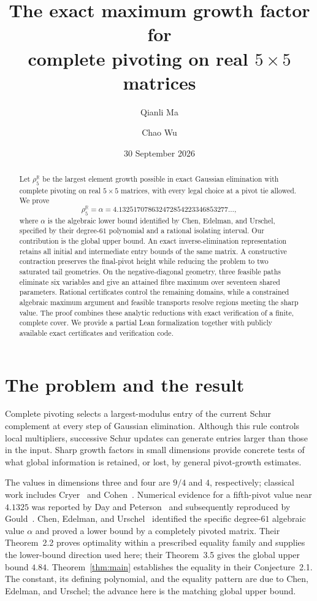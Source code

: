 \documentclass[11pt,reqno]{amsart}
\title[The exact growth factor for complete pivoting]
{The exact maximum growth factor for\\
complete pivoting on real \(5\times5\) matrices}
\author{Qianli Ma}
\author{Chao Wu}
\date{30 September 2026}
\theoremstyle{definition}
\theoremstyle{remark}
\newcommand{\R}{\mathbb R}
\begin{document}
\begin{abstract}
Let \(\rho_5^{\R}\) be the largest element growth possible in exact
Gaussian elimination with complete pivoting on real \(5\times5\) matrices,
with every legal choice at a pivot tie allowed. We prove
\[
\rho_5^{\R}=\alpha
=4.132517078632472854223346853277\ldots,
\]
where \(\alpha\) is the algebraic lower bound identified by
Chen, Edelman, and Urschel, specified by their degree-\(61\) polynomial and
a rational isolating interval. Our contribution is the global upper bound.
An exact inverse-elimination representation retains all initial and
intermediate entry bounds of the same matrix. A constructive contraction
preserves the final-pivot height while reducing the problem to two
saturated tail geometries. On the negative-diagonal geometry, three
feasible paths eliminate six variables and give an attained fibre maximum
over seventeen shared parameters. Rational certificates control the
remaining domains, while a constrained algebraic maximum argument and
feasible transports resolve regions meeting the sharp value. The proof
combines these analytic reductions with exact verification of a finite,
complete cover. We provide a partial Lean formalization together with publicly
available exact certificates and verification code.
\end{abstract}

\maketitle

\section{The problem and the result}

Complete pivoting selects a largest-modulus entry of the current Schur
complement at every step of Gaussian elimination. Although this rule
controls local multipliers, successive Schur updates can generate entries
larger than those in the input. Sharp growth factors in small dimensions
provide concrete tests of what global information is retained, or lost,
by general pivot-growth estimates.

The values in dimensions three and four are \(9/4\) and \(4\),
respectively; classical work includes Cryer~\cite{Cryer1968} and
Cohen~\cite{Cohen1974}. Numerical evidence for a fifth-pivot value near
\(4.1325\) was reported by Day and Peterson~\cite{DayPeterson1988}
and subsequently reproduced by Gould~\cite{Gould1991}.
Chen, Edelman, and Urschel~\cite{ChenEdelmanUrschel2026} identified the
specific degree-\(61\) algebraic value \(\alpha\) and proved a lower bound
by a completely pivoted matrix. Their Theorem~2.2 proves optimality within
a prescribed equality family and supplies the lower-bound direction used
here; their Theorem~3.5 gives the global upper bound \(4.84\).
Theorem~\ref{thm:main} establishes the equality in their Conjecture~2.1.
The constant, its defining polynomial, and the equality pattern are
due to Chen, Edelman, and Urschel; the advance here is the matching
global upper bound.
\end{document}
